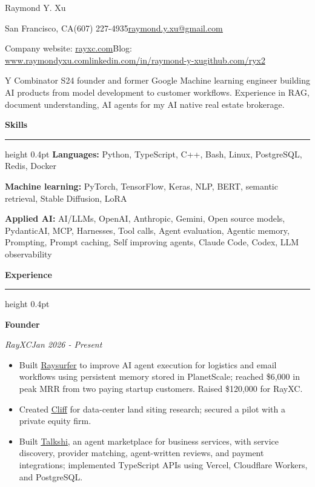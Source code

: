 \documentclass[11pt,letterpaper]{article}
\let\ResumeOriginalHref\href
\renewcommand{\href}[2]{\ResumeOriginalHref{#1}{\underline{#2}}}
\newcommand{\ResumeSection}[1]{%
  \par\addvspace{6pt}\Needspace{42pt}%
  {\fontsize{13}{15}\selectfont\bfseries #1\par}%
  \vspace{2pt}\hrule height 0.4pt\vspace{4pt}}
\newcommand{\ResumeRole}[3]{%
  \par\addvspace{3pt}\Needspace{49pt}%
  {\fontsize{11}{13}\selectfont\bfseries #1\par}%
  {\itshape #2\hfill\upshape #3\par}\nopagebreak}
\newenvironment{ResumeItems}{%
  \begin{itemize}[label={\raisebox{0.15ex}{\fontsize{7}{7}\selectfont\rmfamily\textbullet}},leftmargin=11pt,labelsep=5pt,
    topsep=1.5pt,itemsep=0.7pt,parsep=0pt,partopsep=0pt]}{\end{itemize}}
\begin{document}
\fontsize{10.5}{11.8}\selectfont
\begin{center}
{\fontsize{27}{29}\selectfont Raymond Y. Xu}\par\vspace{3pt}
{\small San Francisco, CA\enspace\textbar{}\enspace{}(607) 227-4935\enspace\textbar{}\enspace{}\href{mailto:raymond.y.xu@gmail.com}{raymond.y.xu@gmail.com}}\par
{\small Company website: \href{https://rayxc.com/}{rayxc.com}\enspace\textbar{}\enspace{}Blog: \href{https://www.raymondyxu.com/}{www.raymondyxu.com}\enspace\textbar{}\enspace{}\href{https://linkedin.com/in/raymond-y-xu}{linkedin.com/in/raymond-y-xu}\enspace\textbar{}\enspace{}\href{https://github.com/ryx2}{github.com/ryx2}}\par
\end{center}
\vspace{1pt}
 Y Combinator S24 founder and former Google Machine learning engineer building AI products from model development to customer workflows. Experience in RAG, document understanding, AI agents for my AI native real estate brokerage.\par
\ResumeSection{Skills}
\textbf{Languages:} Python, TypeScript, C++, Bash, Linux, PostgreSQL, Redis, Docker\par
\textbf{Machine learning:} PyTorch, TensorFlow, Keras, NLP, BERT, semantic retrieval, Stable Diffusion, LoRA\par
\textbf{Applied AI:} AI/LLMs, OpenAI, Anthropic, Gemini, Open source models, PydanticAI, MCP, Harnesses, Tool calls, Agent evaluation, Agentic memory, Prompting, Prompt caching, Self improving agents, Claude Code, Codex, LLM observability\par
\ResumeSection{Experience}
\ResumeRole{Founder}{RayXC}{Jan 2026 - Present}
\begin{ResumeItems}
\item Built \href{https://www.raysurfer.com/}{Raysurfer} to improve AI agent execution for logistics and email workflows using persistent memory stored in PlanetScale; reached \$6,000 in peak MRR from two paying startup customers. Raised \$120,000 for RayXC.
\item Created \href{https://www.cliffcenter.com/}{Cliff} for data-center land siting research; secured a pilot with a private equity firm.
\item Built \href{https://talkshi.com/}{Talkshi}, an agent marketplace for business services, with service discovery, provider matching, agent-written reviews, and payment integrations; implemented TypeScript APIs using Vercel, Cloudflare Workers, and PostgreSQL.
\end{ResumeItems}
\end{document}

